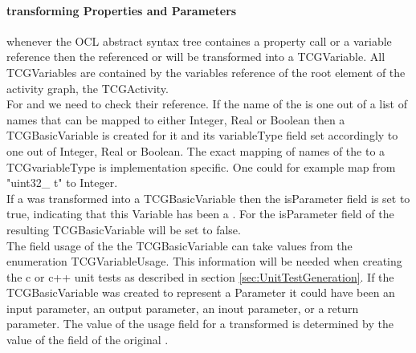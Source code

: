 \paragraph{transforming Properties and Parameters}
whenever the OCL abstract syntax tree containes a property call or a variable reference then the referenced  or  will be transformed into a TCGVariable. All TCGVariables are contained by the variables reference of the root element of the activity graph, the TCGActivity.\\
For  and  we need to check their  reference. If the name of the  is one out of a list of names that can be mapped to either Integer, Real or Boolean then a TCGBasicVariable is created for it and its variableType field set accordingly to one out of Integer, Real or Boolean. The exact mapping of names of the  to a TCGvariableType is implementation specific. One could for example map from "uint32\_ t" to Integer.\\
If a  was transformed into a TCGBasicVariable then the isParameter field is set to true, indicating that this Variable has been a . For  the isParameter field of the resulting TCGBasicVariable will be set to false.\\
The field usage of the the TCGBasicVariable can take values from the enumeration TCGVariableUsage. This information will be needed when creating the c or c++ unit tests as described in section \ref{sec:UnitTestGeneration}. If the TCGBasicVariable was created to represent a Parameter it could have been an input parameter, an output parameter, an inout parameter, or a return parameter. The value of the usage field for a transformed  is determined by the value of the  field of the original .\\




